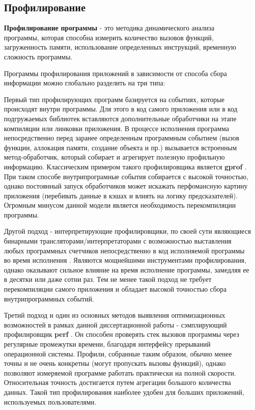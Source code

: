 \subsection {Профилирование}\label{p1:optop:profile}
\textbf{Профилирование программы}  - это методика динамического анализа программы, которая способна измерить количество вызовов функций, загруженность памяти, использование определенных инструкций,  временную сложность программы.

Программы профилирования приложений в зависимости от способа сбора информации можно глобально разделить на три типа:

Первый тип профилирующих программ базируется на событиях, которые происходят внутри программы. Для этого в код самого приложения или в код подгружаемых библиотек  вставляются дополнительные обработчики на этапе компиляции или линковки приложения. В процессе исполнения программа непосредственно перед заранее определенным программным событием (вызов функции, аллокация памяти, создание объекта и пр.) вызывается встроенным метод-обработчик, который собирает и агрегирует полезную профильную информацию. Классическим примером такого профилировщика является \textbf{gprof} \cite{graham2004gprof}. При таком способе внутрипрограмные события собирается с высокой точностью, однако постоянный запуск обработчиков может искажать перфомансную картину приложения (перебивать данные в кэшах и  влиять на логику предсказателей). Огромным минусом данной модели является необходимость перекомпиляции программы.

Другой подход - интерпретирующие профилировщики, по своей сути являющиеся бинарными трансляторами/интерпретаторами с возможностью выставления любых программных счетчиков непосредственно в код исполняемой программы во время исполнения \cite{reinders2005vtune, nethercote2007valgrind}. Являются мощнейшими инструментами профилирования, однако оказывают сильное влияние на время исполнение программы, замедляя ее в десятки или даже сотни раз. Тем не менее такой подход не требует перекомпиляции самого приложения и обладает высокой точностью сбора внутрипрограммных событий.

Третий подход и один из основных методов выявления оптимизационных возможностей в рамках данной диссертационной работы -  сэмплирующий профилировщик \textbf{perf} \cite{de2010new}. Он способен проверять стек вызовов программы через регулярные промежутки времени, благодаря интерфейсу прерываний операционной системы. Профили, собранные таким образом, обычно менее точны и не очень конкретны (могут пропускать вызовы функций), однако позволяют измеряемой программе работать практически на полной скорости. Относительная точность достигается путем агрегации большого количества данных. Такой тип профилирования наиболее удобен для больших приложений, используемых пользователями.


